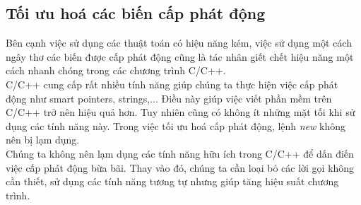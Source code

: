 \documentclass{article}
\begin{document}






\subsection{Tối ưu hoá các biến cấp phát động}
Bên cạnh việc sử dụng các thuật toán có hiệu năng kém, việc sử dụng một cách ngây thơ các biến được cấp phát động cũng là tác nhân giết chết hiệu năng một cách nhanh chóng trong các chương trình C/C++.\\

C/C++ cung cấp rất nhiều tính năng giúp chúng ta thực hiện việc cấp phát động như smart pointers, strings,... Điều này giúp việc viết phần mềm trên C/C++ trở nên hiệu quả hơn. Tuy nhiên cũng có không ít những mặt tối khi sử dụng các tính năng này. Trong việc tối ưu hoá cấp phát động, lệnh \textit{new} không nên bị lạm dụng.\\

Chúng ta không nên lạm dụng các tính năng hữu ích trong C/C++ để dấn điến việc cấp phát động bừa bãi. Thay vào đó, chúng ta cần loại bỏ các lời gọi không cần thiết, sử dụng các tính năng tương tự nhưng giúp tăng hiệu suất chương trình.\\
\end{document}
